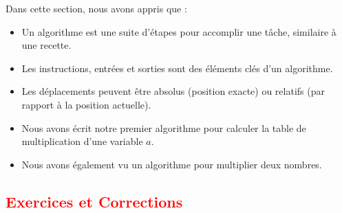 \documentclass{article}
\begin{document}
\begin{tcolorbox}[colback=cyan!10!white, colframe=cyan!75!black, title=\textcolor{white}{Récapitulatif}]
Dans cette section, nous avons appris que :
\begin{itemize}
    \item Un algorithme est une suite d'étapes pour accomplir une tâche, similaire à une recette.
    \item Les instructions, entrées et sorties sont des éléments clés d'un algorithme.
    \item Les déplacements peuvent être absolus (position exacte) ou relatifs (par rapport à la position actuelle).
    \item Nous avons écrit notre premier algorithme pour calculer la table de multiplication d'une variable \( a \).
    \item Nous avons également vu un algorithme pour multiplier deux nombres.
\end{itemize}
\end{tcolorbox}

\subsection{\textcolor{red}{Exercices et Corrections}}
\end{document}
